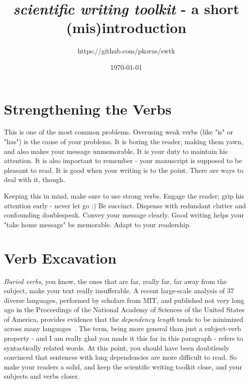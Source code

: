 \documentclass[twocolumn,11pt]{article}
\title{\emph{scientific writing toolkit} - a short (mis)introduction}
\author{https://github.com/pkorus/swtk}
\date{\today}
\begin{document}
\maketitle

	
\section{Strengthening the Verbs}

This is one of the most common problems. Overusing weak verbs (like "is" or "has") is the cause of your problems. It is boring the reader, making them yawn, and also makes your message unmemorable. It is your duty to maintain his attention. It is also important to remember - your manuscript is supposed to be pleasant to read. It is good when your writing is to the point. There are ways to deal with it, though.

Keeping this in mind, make sure to use strong verbs. Engage the reader; grip his attention early - never let go :) Be succinct. Dispense with redundant clutter and confounding doublespeak. Convey your message clearly. Good writing helps your "take home message" be memorable. Adapt to your readership. 

\section{Verb Excavation}

\emph{Buried verbs}, you know, the ones that are far, really far, far away from the subject, make your text really insufferable. A recent large-scale analysis of 37 diverse languages, performed by scholars from MIT, and published not very long ago in the Proceedings of the National Academy of Sciences of the United States of America, provides evidence that the \emph{dependency length} tends to be minimized across many languages~\cite{dlm}. The term, being more general than just a subject-verb property - and I am really glad you made it this far in this paragraph - refers to syntactically related words. At this point, you should have been doubtlessly convinced that sentences with long dependencies are more difficult to read. So make your readers a solid, and keep the scientific writing toolkit close, and your subjects and verbs closer. 
\end{document}
